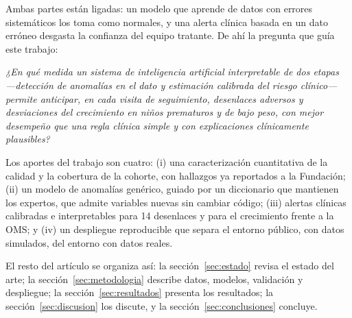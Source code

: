 Ambas partes están ligadas: un modelo que aprende de datos con errores sistemáticos los toma como normales, y una alerta clínica basada en un dato erróneo desgasta la confianza del equipo tratante. De ahí la pregunta que guía este trabajo:

\emph{¿En qué medida un sistema de inteligencia artificial interpretable de dos etapas ---detección de anomalías en el dato y estimación calibrada del riesgo clínico--- permite anticipar, en cada visita de seguimiento, desenlaces adversos y desviaciones del crecimiento en niños prematuros y de bajo peso, con mejor desempeño que una regla clínica simple y con explicaciones clínicamente plausibles?}

Los aportes del trabajo son cuatro: (i) una caracterización cuantitativa de la calidad y la cobertura de la cohorte, con hallazgos ya reportados a la Fundación; (ii) un modelo de anomalías genérico, guiado por un diccionario que mantienen los expertos, que admite variables nuevas sin cambiar código; (iii) alertas clínicas calibradas e interpretables para 14 desenlaces y para el crecimiento frente a la OMS; y (iv) un despliegue reproducible que separa el entorno público, con datos simulados, del entorno con datos reales.

El resto del artículo se organiza así: la sección~\ref{sec:estado} revisa el estado del arte; la sección~\ref{sec:metodologia} describe datos, modelos, validación y despliegue; la sección~\ref{sec:resultados} presenta los resultados; la sección~\ref{sec:discusion} los discute, y la sección~\ref{sec:conclusiones} concluye.
